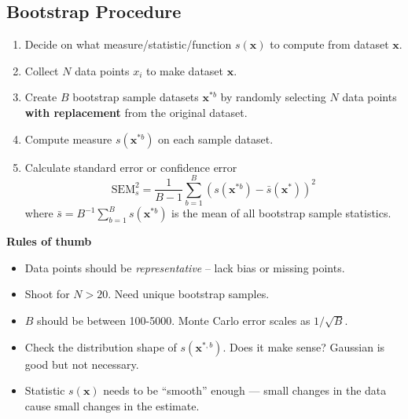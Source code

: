 \documentclass[10pt]{article}
\begin{document}
\begin{multicols*}{2}
\begin{tcolorbox}[cheatbox]
\section*{Bootstrap Procedure}
\begin{enumerate}
    \item Decide on what measure/statistic/function \( s(\mathbf{x}) \) to compute from dataset \( \mathbf{x} \).
    \item Collect \( N \) data points \( x_i \) to make dataset \( \mathbf{x} \).
    \item Create \( B \) bootstrap sample datasets \( \mathbf{x}^{*b} \) by randomly selecting \( N \) data points \textbf{with replacement} from the original dataset.
    \item Compute measure \( s(\mathbf{x}^{*b}) \) on each sample dataset.
    \item Calculate standard error or confidence error 
    \[
    \mathrm{SEM}_s^2 = \frac{1}{B - 1} \sum_{b=1}^{B} (s(\mathbf{x}^{*b}) - \bar{s}(\mathbf{x}^*))^2
    \]
    where \( \bar{s} = B^{-1} \sum_{b=1}^B s(\mathbf{x}^{*b}) \) is the mean of all bootstrap sample statistics.
\end{enumerate}
\end{tcolorbox}

\textbf{Rules of thumb}
\begin{itemize}
    \item Data points should be \textit{representative} -- lack bias or missing points.
    \item Shoot for $N>20$. Need unique bootstrap samples.
    \item $B$ should be between 100-5000. Monte Carlo error scales as $1/\sqrt{B}$. 
    \item Check the distribution shape of $s(\bm x^{*,b})$. Does it make sense? Gaussian is good but not necessary.
    \item Statistic $s(\bm x)$ needs to be “smooth” enough — small changes in the data cause small changes in the estimate.
\end{itemize}




\end{multicols*}
\end{document}
